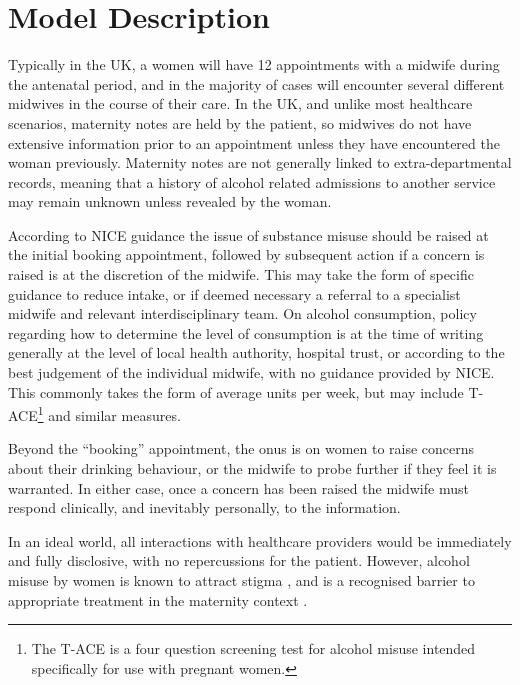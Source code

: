 \section{Model Description}
\label{app:model_description}

Typically in the UK, a women will have 12 appointments with a midwife during the antenatal period, and in the majority of cases will encounter several different midwives \citep{Redshaw2014} in the course of their care. In the UK, and unlike most healthcare scenarios, maternity notes are held by the patient, so midwives do not have extensive information prior to an appointment unless they have encountered the woman previously. Maternity notes are not generally linked to extra-departmental records, meaning that a history of alcohol related admissions to another service may remain unknown unless revealed by the woman.

According to NICE guidance \citep{NICE2010a,NICE2010} the issue of substance misuse should be raised at the initial booking appointment, followed by subsequent action if a concern is raised is at the discretion of the midwife. This may take the form of specific guidance to reduce intake, or if deemed necessary a referral to a specialist midwife and relevant interdisciplinary team. On alcohol consumption, policy regarding how to determine the level of consumption is at the time of writing generally at the level of local health authority, hospital trust, or according to the best judgement of the individual midwife, with no guidance provided by NICE. This commonly takes the form of average units per week, but may include \ac{T-ACE}\footnote{The \ac{T-ACE} is a four question screening test for alcohol misuse intended specifically for use with pregnant women.} \citep{Sokol1989863} and similar measures. 

Beyond the \enquote{booking} appointment, the onus is on women to raise concerns about their drinking behaviour, or the midwife to probe further if they feel it is warranted. In either case, once a concern has been raised the midwife must respond clinically, and inevitably personally, to the information.

In an ideal world, all interactions with healthcare providers would be immediately and fully disclosive, with no repercussions for the patient. However, alcohol misuse by women is known to attract stigma \citep{Gomberg1988}, and is a recognised barrier to appropriate treatment in the maternity context \citep{NICE2010,Radcliffe2011}.

